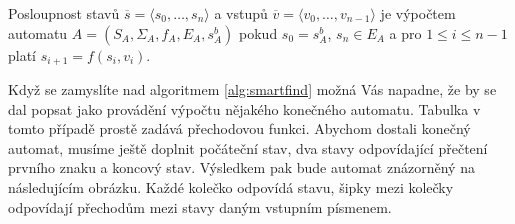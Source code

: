 \begin{definition} \label{def:vypocet}
Posloupnost stavů \(\overline{s}=\langle s_0,\ldots, s_n\rangle\)
a vstupů \(\overline{v}=\langle v_0,\ldots, v_{n-1}\rangle\) je výpočtem automatu
\(A=(S_A,\Sigma_A,f_A, E_A,s_A^b)\) pokud \(s_0=s_A^b\), \(s_n\in E_A\) a pro \(1\leq i\leq n-1\)
platí \(s_{i+1} = f(s_i,v_i)\).
\end{definition}

Když se zamyslíte nad algoritmem \ref{alg:smartfind} možná Vás napadne, že by se dal
popsat jako provádění výpočtu nějakého konečného automatu. Tabulka v tomto případě
prostě zadává přechodovou funkci.  Abychom dostali konečný automat, musíme ještě
doplnit počáteční stav, dva stavy odpovídající přečtení prvního znaku a koncový stav.
Výsledkem pak bude automat znázorněný na následujícím obrázku. Každé kolečko odpovídá
stavu, šipky mezi kolečky odpovídají přechodům mezi stavy daným vstupním písmenem.

